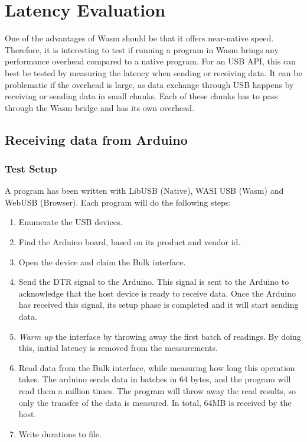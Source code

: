 \section{Latency Evaluation}

One of the advantages of \acrshort{Wasm} should be that it offers near-native speed. Therefore, it is interesting to test if running a program in Wasm brings any performance overhead compared to a native program. For an USB API, this can best be tested by measuring the latency when sending or receiving data. It can be problematic if the overhead is large, as data exchange through USB happens by receiving or sending data in small chunks. Each of these chunks has to pass through the Wasm bridge and has its own overhead.

\subsection{Receiving data from Arduino}

\subsubsection{Test Setup}
A program has been written with LibUSB (Native), WASI USB (Wasm) and WebUSB (Browser). Each program will do the following steps:

\begin{enumerate}
\item Enumerate the USB devices.
\item Find the Arduino board, based on its product and vendor id.
\item Open the device and claim the Bulk interface.
\item Send the \acrfull{DTR} signal to the Arduino. This signal is sent to the Arduino to acknowledge that the host device is ready to receive data. Once the Arduino has received this signal, its setup phase is completed and it will start sending data.
\item \textit{Warm up } the interface by throwing away the first batch of readings. By doing this, initial latency is removed from the measurements.
\item Read data from the Bulk interface, while measuring how long this operation takes. The arduino sends data in batches in 64 bytes, and the program will read them a million times. The program will throw away the read results, so only the transfer of the data is measured. In total, 64MB is received by the host.
\item Write durations to file.
\end{enumerate}

